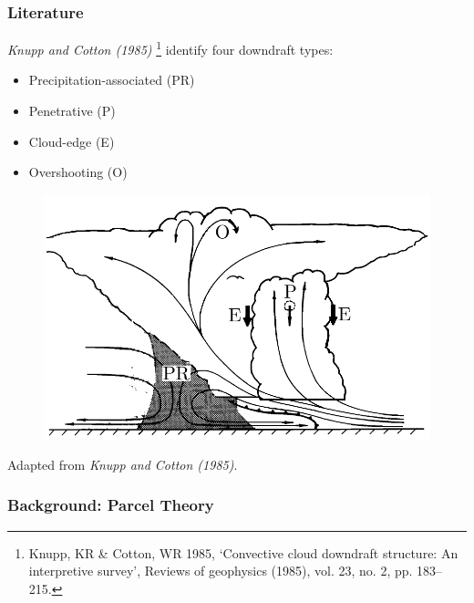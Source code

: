 \documentclass{beamer}
\begin{document}
\begin{frame}
    \frametitle{Literature}
    \emph{Knupp and Cotton (1985)}
    \footnote{ \tiny
        Knupp, KR \& Cotton, WR 1985, ‘Convective cloud downdraft
        structure: An interpretive survey’, Reviews of geophysics (1985),
        vol. 23, no. 2, pp. 183–215.}
    identify four downdraft types:
    \vspace{-2mm}
    \begin{multicols}{2}
        \small
        \begin{itemize}
            \item Precipitation-associated (PR)
            \item Penetrative (P)
            \item Cloud-edge (E)
            \item Overshooting (O)
        \end{itemize}
    \end{multicols}
    \vspace{-3mm}
    \begin{figure}[ht]
        \centering
        \includegraphics[width=0.6\linewidth]{figures/knupp_cotton_types.pdf}
    \end{figure}
    \vspace{-3mm}
    \centering \tiny Adapted from \emph{Knupp and Cotton (1985)}.
\end{frame}

\begin{frame}
    \frametitle{Background: Parcel Theory}

\end{frame}
\end{document}
